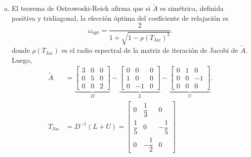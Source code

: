 \begin{frame}
	\begin{solution}
		\begin{enumerate}[b)]
			\item

			      El teorema de \alert{Ostrowoski-Reich} afirma que si
			      $\widetilde{A}$ es simétrica, definida positiva y
			      tridiagonal, la elección óptima del
			      coeficiente de relajación es
			      \begin{equation*}
				      \omega_{\text{opt}}=
				      \dfrac{2}{
				      1+
				      \sqrt{1-{\rho\left(T_{\text{Jac}}\right)}^{2}}
				      }.
			      \end{equation*}
			      donde \begin{math}
				      \rho\left(T_{\text{Jac}}\right)
			      \end{math}
			      es el radio espectral de la matriz de iteración de
			      Jacobi de $\widetilde{A}$.
			      Luego,
			      \begin{align*}
				      \widetilde{A}  & =
				      \underbrace{ \begin{bmatrix}
						                   3 & 0 & 0 \\
						                   0 & 5 & 0 \\
						                   0 & 0 & 2
					                   \end{bmatrix}}_{\displaystyle D}
				      -
				      \underbrace{\begin{bmatrix}
						                  0 & 0  & 0 \\
						                  1 & 0  & 0 \\
						                  0 & -1 & 0
					                  \end{bmatrix}}_{\displaystyle L}
				      -
				      \underbrace{\begin{bmatrix}
						                  0 & 1 & 0  \\
						                  0 & 0 & -1 \\
						                  0 & 0 & 0
					                  \end{bmatrix}}_{\displaystyle U}. \\
				      T_{\text{Jac}} & =D^{-1}\left(L+U\right)=
				      \begin{bmatrix}
					      0            & \dfrac{1}{3}  & 0             \\
					      \dfrac{1}{5} & 0             & -\dfrac{1}{5} \\
					      0            & -\dfrac{1}{2} & 0

\end{bmatrix}
\end{align*}
\end{enumerate}
\end{solution}
\end{frame}
